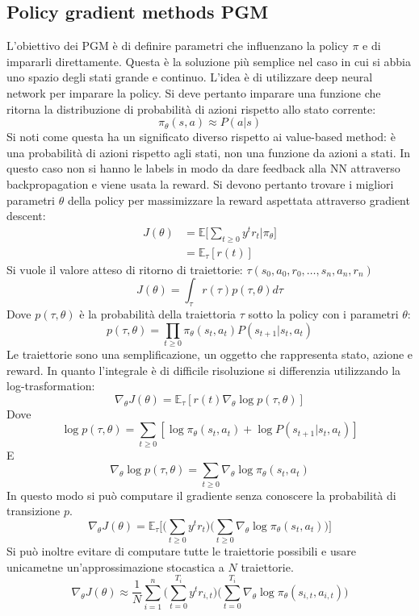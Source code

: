 	\subsection{Policy gradient methods PGM}
	L'obiettivo dei PGM \`e di definire parametri che influenzano la policy $\pi$ e di impararli direttamente.
	Questa \`e la soluzione pi\`u semplice nel caso in cui si abbia uno spazio degli stati grande e continuo.
	L'idea \`e di utilizzare deep neural network per imparare la policy.
	Si deve pertanto imparare una funzione che ritorna la distribuzione di probabilit\`a di azioni rispetto allo stato corrente:
	$$\pi_\theta(s,a)\approx P(a|s)$$
	Si noti come questa ha un significato diverso rispetto ai value-based method: \`e una probabilit\`a di azioni rispetto agli stati, non una funzione da azioni a stati.
	In questo caso non si hanno le labels in modo da dare feedback alla NN attraverso backpropagation e viene usata la reward.
	Si devono pertanto trovare i migliori parametri $\theta$ della policy per massimizzare la reward aspettata attraverso gradient descent:
	\begin{align*}
		J(\theta) &= \mathbb{E}\biggl[\sum\limits_{t\ge 0}y^tr_t|\pi_\theta\biggr]\\
		&=\mathbb{E}_\tau[r(t)]
	\end{align*}
	Si vuole il valore atteso di ritorno di traiettorie: $\tau(s_0,a_0,r_0, \dots, s_n,a_n,r_n)$
	$$J(\theta) = \int_\tau r(\tau)p(\tau,\theta)d\tau$$
	Dove $p(\tau,\theta)$ \`e la probabilit\`a della traiettoria $\tau$ sotto la policy con i parametri $\theta$:
	$$p(\tau,\theta) = \prod\limits_{t\ge 0}\pi_\theta(s_t,a_t)P(s_{t+1}|s_t,a_t)$$
	Le traiettorie sono una semplificazione, un oggetto che rappresenta stato, azione e reward.
	In quanto l'integrale \`e di difficile risoluzione si differenzia utilizzando la log-trasformation:
	$$\nabla_\theta J(\theta) =\mathbb{E}_\tau[r(t)\nabla_\theta\log p(\tau,\theta)]$$
	Dove
	$$\log p(\tau,\theta) = \sum\limits_{t\ge 0} [\log \pi_\theta(s_t,a_t) + \log P(s_{t+1}|s_t,a_t)]$$
	E
	$$\nabla_\theta \log p(\tau,\theta) = \sum\limits_{t\ge 0}\nabla_\theta \log\pi_\theta(s_t,a_t)$$
	In questo modo si pu\`o computare il gradiente senza conoscere la probabilit\`a di transizione $p$.
	$$\nabla_\theta J(\theta) = \mathbb{E}_\tau\biggl[\biggl(\sum\limits_{t\ge 0}y^tr_t\biggr)\biggl(\sum\limits_{t\ge 0}\nabla_\theta\log\pi_\theta(s_t,a_t)\biggr)\biggr]$$
	Si pu\`o inoltre evitare di computare tutte le traiettorie possibili e usare unicametne un'approssimazione stocastica a $N$ traiettorie.
	$$\nabla_\theta J(\theta) \approx \dfrac{1}{N}\sum\limits_{i=1}^n\biggl(\sum\limits_{t = 0}^{T_i}y^tr_{i,t}\biggr)\biggl(\sum\limits_{t= 0}^{T_i}\nabla_\theta\log\pi_\theta(s_{i,t},a_{i,t})\biggr)$$

